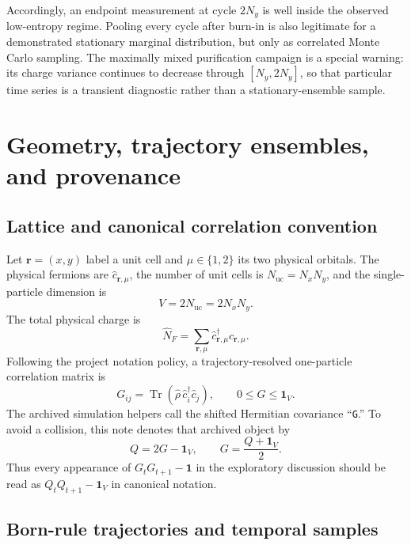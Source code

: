 \documentclass[aps,prb,twocolumn,nofootinbib,superscriptaddress,floatfix]{revtex4-2}
\newcommand{\Tr}{\operatorname{Tr}}
\newcommand{\Nuc}{N_{\mathrm{uc}}}
\newcommand{\Vsp}{V}
\newcommand{\Qcov}{Q}
\begin{document}
Accordingly, an endpoint measurement at cycle $2N_y$ is well inside the
observed low-entropy regime.  Pooling every cycle after burn-in is also
legitimate for a demonstrated stationary marginal distribution, but only as
correlated Monte Carlo sampling.  The maximally mixed purification campaign
is a special warning: its charge variance continues to decrease through
$[N_y,2N_y]$, so that particular time series is a transient diagnostic rather
than a stationary-ensemble sample.

\section{Geometry, trajectory ensembles, and provenance}
\label{sec:campaigns}

\subsection{Lattice and canonical correlation convention}

Let $\boldsymbol r=(x,y)$ label a unit cell and
$\mu\in\{1,2\}$ its two physical orbitals.  The physical fermions are
$\hat c_{\boldsymbol r,\mu}$, the number of unit cells is
$\Nuc=N_xN_y$, and the single-particle dimension is
\begin{equation}
 \Vsp=2\Nuc=2N_xN_y.
 \label{eq:volume}
\end{equation}
The total physical charge is
\begin{equation}
 \hat N_F=\sum_{\boldsymbol r,\mu}
 \hat c_{\boldsymbol r,\mu}^{\dagger}\hat c_{\boldsymbol r,\mu}.
\end{equation}
Following the project notation policy, a trajectory-resolved one-particle
correlation matrix is
\begin{equation}
 G_{ij}=\Tr\!\left(\hat\rho\,
 \hat c_i^\dagger\hat c_j\right),
 \qquad 0\le G\le\mathbf{1}_{\Vsp}.
 \label{eq:canonicalG}
\end{equation}
The archived simulation helpers call the shifted Hermitian covariance
``\texttt{G}.''  To avoid a collision, this note denotes that archived object by
\begin{equation}
 \Qcov=2G-\mathbf{1}_{\Vsp},
 \qquad G=\frac{\Qcov+\mathbf{1}_{\Vsp}}{2}.
 \label{eq:archivebridge}
\end{equation}
Thus every appearance of $G_tG_{t+1}-\mathbf{1}$ in the exploratory
discussion should be read as
$\Qcov_t\Qcov_{t+1}-\mathbf{1}_{\Vsp}$ in canonical notation.

\subsection{Born-rule trajectories and temporal samples}
\end{document}
